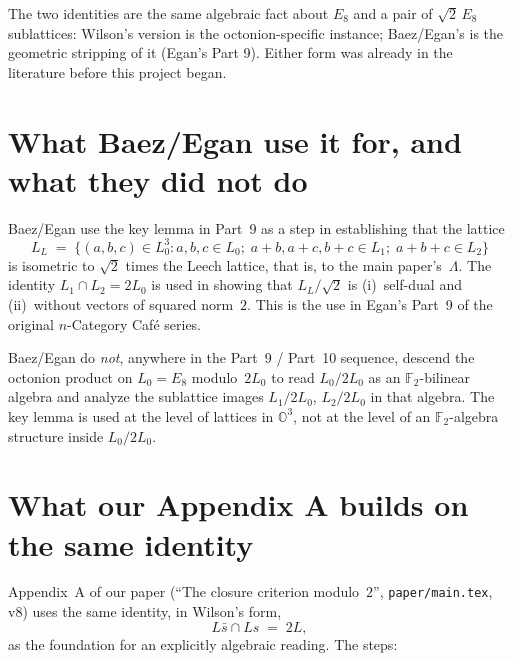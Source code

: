 \documentclass[11pt]{amsart}
\newcommand{\LL}{\Lambda}
\newcommand{\OO}{\mathbb{O}}
\newcommand{\FF}{\mathbb{F}}
\begin{document}
The two identities are the same algebraic fact about $E_8$ and a
pair of $\sqrt{2}\,E_8$ sublattices: Wilson's version is the
octonion-specific instance; Baez/Egan's is the geometric stripping
of it (Egan's Part 9).  Either form was already in the literature
before this project began.

\section{What Baez/Egan use it for, and what they did not do}

Baez/Egan use the key lemma in Part~9 as a step in establishing
that the lattice
\[
  L_L \;=\; \{(a, b, c) \in L_0^3 :
    a, b, c \in L_0;\;
    a{+}b, a{+}c, b{+}c \in L_1;\;
    a{+}b{+}c \in L_2\}
\]
is isometric to $\sqrt{2}$ times the Leech lattice, that is, to the main paper's~$\LL$.  The identity $L_1 \cap L_2 = 2 L_0$
is used in showing that $L_L/\sqrt{2}$ is (i)~self-dual and
(ii)~without vectors of squared norm~$2$.  This is the use in Egan's
Part~9 of the original $n$-Category Caf\'e series.

Baez/Egan do \emph{not}, anywhere in the Part~9 / Part~10 sequence,
descend the octonion product on $L_0 = E_8$ modulo~$2 L_0$ to read
$L_0 / 2 L_0$ as an $\FF_2$-bilinear algebra and analyze the sublattice
images $L_1 / 2 L_0$, $L_2 / 2 L_0$ in that algebra.  The key lemma
is used at the level of lattices in $\OO^3$, not at the level of an
$\FF_2$-algebra structure inside $L_0 / 2 L_0$.

\section{What our Appendix A builds on the same identity}

Appendix~A of our paper (``The closure criterion modulo~$2$'',
\texttt{paper/main.tex}, v8) uses the same identity, in Wilson's
form,
\begin{equation}\label{eq:key}
  L\bar s \cap Ls \;=\; 2 L, \tag{$\dagger$}
\end{equation}
as the foundation for an explicitly algebraic reading.
The steps:
\end{document}
